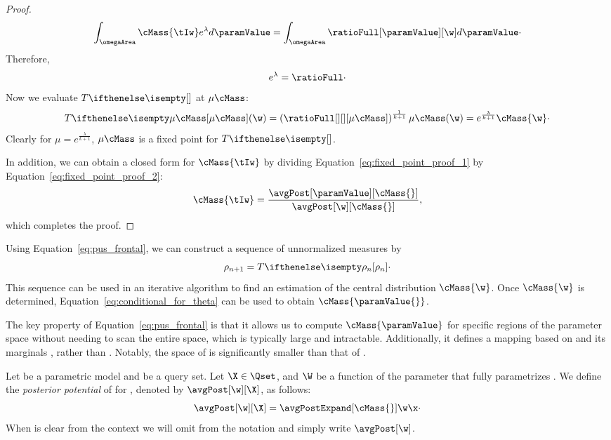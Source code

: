 \begin{proof}
    \begin{equation*}
        \int_{\omegaArea} \cMass{\tIw} e^{\lambda} d\paramValue =
        \int_{\omegaArea} \ratioFull[\paramValue][\w] d\paramValue \cdot
    \end{equation*}
    Therefore,
    \begin{equation}
        e^{\lambda} = \ratioFull \cdot
        \label{eq:fixed_point_proof_2}
    \end{equation}
    Now we evaluate $\fpMap{}$ at $\fixedPoint$:
    \begin{equation*}
        \fpMap{\fixedPoint}(\w) =
        \left( \ratioFull[][][\fixedPoint] \right)^{\frac{1}{k+1}} \fixedPoint(\w) =
        e^{\frac{\lambda}{k+1}} \cMass{\w} \cdot
    \end{equation*}
    Clearly for $\mu = e^{\frac{\lambda}{k+1}}$, $\fixedPoint$ is a fixed point for $\fpMap{}$.

    In addition, we can obtain a closed form for $\cMass{\tIw}$ by dividing
    Equation~\ref{eq:fixed_point_proof_1} by Equation~\ref{eq:fixed_point_proof_2}:
    \begin{equation*}
        \cMass{\tIw} = \frac{\avgPost[\paramValue][\cMass{}]}{\avgPost[\w][\cMass{}]},
    \end{equation*}
    which completes the proof.
\end{proof}

Using Equation~\ref{eq:pus_frontal}, we can construct a sequence of unnormalized measures by
\[\rho_{n+1} = \fpMap{\rho_n} \cdot \]
This sequence can be used in an iterative algorithm to find an estimation of the central distribution
$\cMass{\w}$.
Once $\cMass{\w}$ is determined, Equation~\ref{eq:conditional_for_theta} can be used to obtain $\cMass{\paramValue{}}$.

The key property of Equation~\ref{eq:pus_frontal} is that it allows us to compute $\cMass{\paramValue}$ for
specific regions of the parameter space without needing to scan the entire space, which is typically large and intractable.
Additionally, it defines a mapping based on \w and its marginals \w[i], rather than \paramValue.
Notably, the space of \w is significantly smaller than that of \paramValue.

\begin{definition}
    Let \pmodel be a parametric model and \Qset be a query set.
    Let $\X \in \Qset$, and $\W$ be a function of the parameter \param that fully parametrizes \X.
    We define the \emph{posterior potential} of \X for \w, denoted by $\avgPost[\w][\X]$, as
    follows:
    \begin{equation*}
        \avgPost[\w][\X] = \avgPostExpand[\cMass{}]{\w}{\x} \cdot
    \end{equation*}
    When \X is clear from the context we will omit \X from the notation and simply write $\avgPost[\w]$.
\end{definition}

